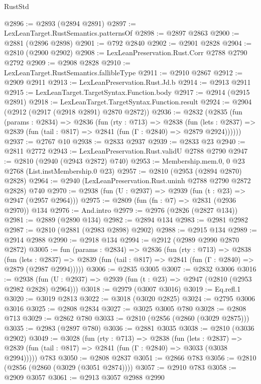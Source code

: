 \begin{lexlean}{RustStd}
\begin{coremodule}
@2896 := @2893 (@2894 @2891)
@2897 := LexLeanTarget.RustSemantics.patternsOf
@2898 := @2897 @2863
@2900 := @2881 (@2896 @2898)
@2901 := @792 @2840
@2902 := @2901 @2828
@2904 := @2810 (@2900 @2902)
@2908 := LexLeanPreservation.Rust.Corr @2788 @2790 @2792
@2909 := @2908 @2828
@2910 := LexLeanTarget.RustSemantics.fallibleType
@2911 := @2910 @2867
@2912 := @2909 @2911
@2913 := LexLeanPreservation.Rust.Jd.b
@2914 := @2913 @2911
@2915 := LexLeanTarget.TargetSyntax.Function.body
@2917 := @2914 (@2915 @2891)
@2918 := LexLeanTarget.TargetSyntax.Function.result
@2924 := @2904 (@2912 (@2917 (@2918 @2891) @2870 @2872))
@2936 := @2832
    (@2835
      (fun (params : @2834) =>
      @2836
        (fun (rty : @713) =>
        @2838
          (fun (lets : @2837) =>
          @2839 (fun (tail : @817) => @2841 (fun (Γ : @2840) => @2879 @2924))))))
@2937 := @2767 @10
@2938 := @2833 @2937
@2939 := @2833 @23
@2940 := @2811 @2772
@2943 := LexLeanPreservation.Rust.validU @2788 @2790
@2947 := @2810 (@2940 (@2943 @2872) @740)
@2953 := Membership.mem.{0, 0} @23 @2768 (List.instMembership.{0} @23)
@2957 := @2810 (@2953 (@2894 @2870) @2828)
@2964 := @2940 (LexLeanPreservation.Rust.uninh @2788 @2790 @2872 @2828) @740
@2970 := @2938 (fun (U : @2937) => @2939 (fun (t : @23) => @2947 (@2957 @2964)))
@2975 := @2809 (fun (fn : @7) => @2831 (@2936 @2970)) @134
@2976 := And.intro
@2979 := @2976 (@2826 (@2827 @134))
@2981 := @2889 (@2890 @134)
@2982 := @2894 @134
@2983 := @2981 @2982
@2987 := @2810 (@2881 (@2983 @2898) @2902)
@2988 := @2915 @134
@2989 := @2914 @2988
@2990 := @2918 @134
@2994 := @2912 (@2989 @2990 @2870 @2872)
@3005 := fun (params : @2834) =>
  @2836
    (fun (rty : @713) =>
    @2838
      (fun (lets : @2837) =>
      @2839 (fun (tail : @817) => @2841 (fun (Γ : @2840) => @2879 (@2987 @2994)))))
@3006 := @2835 @3005
@3007 := @2832 @3006
@3016 := @2938 (fun (U : @2937) => @2939 (fun (t : @23) => @2947 (@2810 (@2953 @2982 @2828) @2964)))
@3018 := @2979 (@3007 @3016)
@3019 := Eq.refl.{1}
@3020 := @3019 @2813
@3022 := @3018 (@3020 @2825)
@3024 := @2795 @3006 @3016
@3025 := @2808 @2834
@3027 := @3025 @3005 @780
@3028 := @2808 @713
@3029 := @2862 @780
@3033 := @2810 (@2856 (@2860 (@3029 @2875)))
@3035 := @2983 (@2897 @780)
@3036 := @2881 @3035
@3038 := @2810 (@3036 @2902)
@3049 := @3028
    (fun (rty : @713) =>
    @2838
      (fun (lets : @2837) =>
      @2839 (fun (tail : @817) => @2841 (fun (Γ : @2840) => @3033 (@3038 @2994)))))
    @783
@3050 := @2808 @2837
@3051 := @2866 @783
@3056 := @2810 (@2856 (@2860 (@3029 (@3051 @2874))))
@3057 := @2910 @783
@3058 := @2909 @3057
@3061 := @2913 @3057 @2988 @2990

\end{coremodule}
\end{lexlean}
